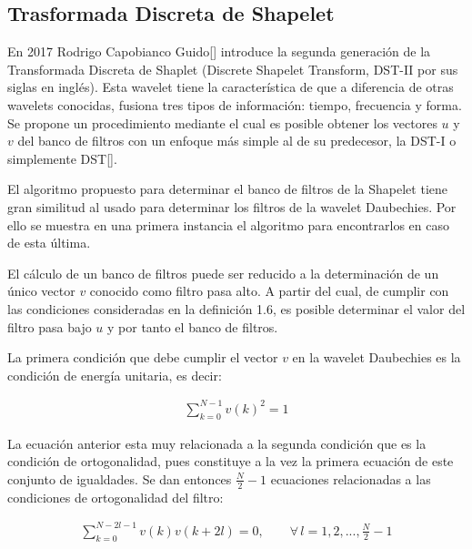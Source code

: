 \subsection{Trasformada Discreta de Shapelet}

\par En 2017 Rodrigo Capobianco Guido[\textcolor{cyan}{\cite{10}}] introduce la segunda generaci\'on de la Transformada Discreta de Shaplet (Discrete Shapelet Transform, DST-II por sus siglas en ingl\'es). Esta wavelet tiene la caracter\'istica de que a diferencia de otras wavelets conocidas, fusiona tres tipos de informaci\'on: tiempo, frecuencia y forma. Se propone un procedimiento mediante el cual es posible obtener los vectores $u$ y $v$ del banco de filtros con un enfoque m\'as simple al de su predecesor, la DST-I o simplemente DST[\textcolor{cyan}{\cite{11}}].

\par El algoritmo propuesto para determinar el banco de filtros de la Shapelet tiene gran similitud al usado para determinar los filtros de la wavelet Daubechies. Por ello se muestra en una primera instancia el algoritmo para encontrarlos en caso de esta \'ultima.

\par El c\'alculo de un banco de filtros puede ser reducido a la determinaci\'on de un \'unico vector $v$ conocido como filtro pasa alto. A partir del cual, de cumplir con las condiciones consideradas en la definici\'on 1.6, es posible determinar el valor del filtro pasa bajo $u$ y por tanto el banco de filtros.

\par La primera condici\'on que debe cumplir el vector $v$ en la wavelet Daubechies es la condici\'on de energ\'ia unitaria, es decir:

\begin{eqnarray}
\sum_{k=0}^{N-1}v(k)^2=1
\label{energiaunitaria}
\end{eqnarray}

\par La ecuaci\'on anterior esta muy relacionada a la segunda condici\'on que es la condici\'on de ortogonalidad, pues constituye a la vez la primera ecuaci\'on de este conjunto de igualdades. Se dan entonces $\frac{N}{2}-1$ ecuaciones relacionadas a las condiciones de ortogonalidad del filtro:

\begin{eqnarray}
\sum_{k=0}^{N-2l-1}v(k)v(k+2l)=0,\qquad\forall\,l=1,2,...,\frac{N}{2}-1
\label{ortogonalidad}
\end{eqnarray}

